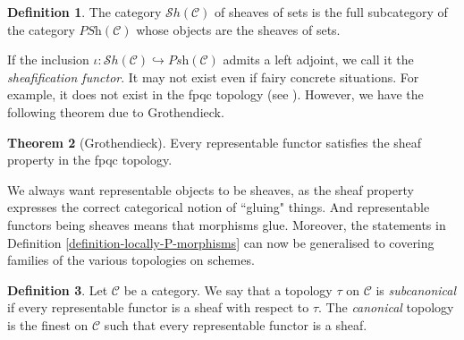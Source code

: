 \documentclass[11pt]{amsart}
\newcommand{\sS}{{\mathcal S}}
\newcommand{\Sh}{\sS h}
\theoremstyle{definition}
\newtheorem{theorem}{Theorem}[section]
\newtheorem{definition}[theorem]{Definition}
\begin{document}
\begin{definition}
	\label{definition-category-sheaves-sets}
	The category {\it $\Sh(\mathcal{C})$}
	of sheaves of sets is the full subcategory of the category
	$\textit{PSh}(\mathcal{C})$ whose objects are the sheaves of sets.
\end{definition}


If the inclusion $\iota: \Sh(\mathcal{C})\hookrightarrow \textit{Psh}(\mathcal{C})$ admits a left adjoint, we call it the \textit{sheafification functor}. It may not exist even if fairy concrete situations. For example, it does not exist in the fpqc topology (see \cite[Theorem 5.5]{Waterhouse-fpqc-sheafification}). However, we have the following theorem due to Grothendieck.

\begin{theorem}[Grothendieck]\label{theorem-fpqc-representable}
	Every representable functor satisfies the sheaf property in the fpqc topology.
\end{theorem}

We always want representable objects to be sheaves, as the sheaf property expresses the correct categorical notion of ``gluing" things. And representable functors being sheaves means that morphisms glue. Moreover, the statements in Definition \ref{definition-locally-P-morphisms} can now be generalised to covering families of the various topologies on schemes.

\begin{definition}\label{definition-subcanonical-site}
	Let $\mathcal{C}$ be a category. We say that a topology $\tau$ on $\mathcal{C}$ is \textit{subcanonical} if every representable functor is a sheaf with respect to $\tau$. The \textit{canonical} topology is the finest on $\mathcal{C}$ such that every representable functor is a sheaf.
\end{definition}
\end{document}

